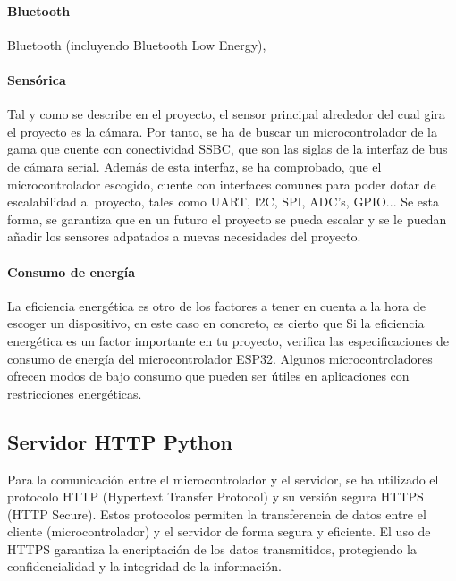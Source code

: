 \paragraph{Bluetooth}
Bluetooth (incluyendo Bluetooth Low Energy),

\paragraph{Sensórica}
Tal y como se describe en el proyecto, el sensor principal alrededor del cual gira el proyecto es la cámara. Por tanto, se ha de buscar un microcontrolador de la gama que cuente con conectividad SSBC, que son las siglas de la interfaz de bus de cámara serial. Además de esta interfaz, se ha comprobado, que el microcontrolador escogido, cuente con interfaces comunes para poder dotar de escalabilidad al proyecto, tales como UART, I2C, SPI, ADC's, GPIO... Se esta forma, se garantiza que en un futuro el proyecto se pueda escalar y se le puedan añadir los sensores adpatados a nuevas necesidades del proyecto. 

\paragraph{Consumo de energía}
La eficiencia energética es otro de los factores a tener en cuenta a la hora de escoger un dispositivo, en este caso en concreto, es cierto que 
Si la eficiencia energética es un factor importante en tu proyecto, verifica las especificaciones de consumo de energía del microcontrolador ESP32. Algunos microcontroladores ofrecen modos de bajo consumo que pueden ser útiles en aplicaciones con restricciones energéticas.

\subsection{Servidor HTTP Python}
Para la comunicación entre el microcontrolador y el servidor, se ha utilizado el protocolo HTTP (Hypertext Transfer Protocol) y su versión segura HTTPS (HTTP Secure). Estos protocolos permiten la transferencia de datos entre el cliente (microcontrolador) y el servidor de forma segura y eficiente. El uso de HTTPS garantiza la encriptación de los datos transmitidos, protegiendo la confidencialidad y la integridad de la información.


